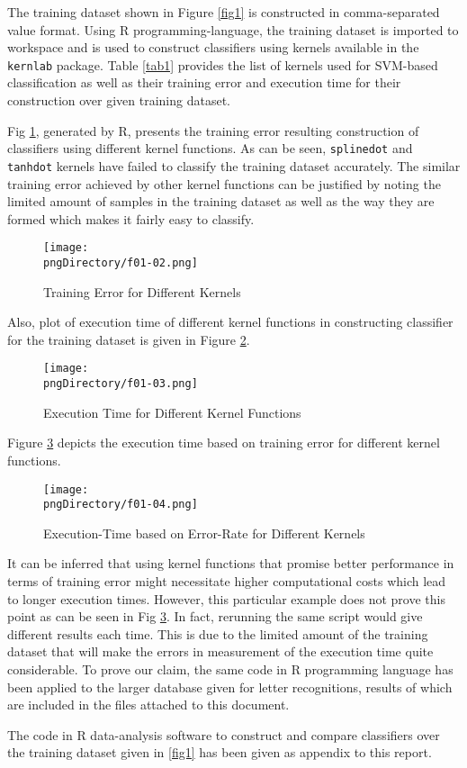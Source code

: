 The training dataset shown in Figure \ref{fig1} is constructed in comma-separated value format. Using R programming-language, the training dataset is imported to workspace and is used to construct classifiers using kernels available in the \texttt{kernlab} package. Table \ref{tab1} provides the list of kernels used for SVM-based classification as well as their training error and execution time for their construction over given training dataset.

Fig \ref{fig2}, generated by R, presents the training error resulting construction of  classifiers using different kernel functions. As can be seen, \texttt{splinedot} and \texttt{tanhdot} kernels have failed to classify the training dataset accurately. The similar training error achieved by other kernel functions can be justified by noting the limited amount of samples in the training dataset as well as the way they are formed  which makes it fairly easy to classify.

\begin{figure}\centering
\texttt{[image: \\pngDirectory/f01-02.png]}
\caption{Training Error for Different Kernels}\label{fig2}
\end{figure}

Also, plot of execution time of different kernel functions in constructing classifier for the training dataset is given in Figure \ref{fig3}.

\begin{figure}\centering
\texttt{[image: \\pngDirectory/f01-03.png]}
\caption{Execution Time for Different Kernel Functions}\label{fig3}
\end{figure}

Figure \ref{fig4} depicts the execution time based on training error for different kernel functions.

\begin{figure}\centering
\texttt{[image: \\pngDirectory/f01-04.png]}
\caption{Execution-Time based on Error-Rate for Different Kernels}\label{fig4}
\end{figure}

It can be inferred that using kernel functions that promise better performance in terms of training error might necessitate higher computational costs which lead to longer execution times. However, this particular example does not prove this point as can be seen in Fig \ref{fig4}. In fact, rerunning the same script would give different results each time. This is due to the limited amount of the training dataset that will make the errors in measurement of the execution time quite considerable. To prove our claim, the same code in R programming language has been applied to the larger database given for letter recognitions, results of which are included in the files attached to this document.

The code in R data-analysis software to construct and compare classifiers over the training dataset given in \ref{fig1} has been given as appendix to this report.
